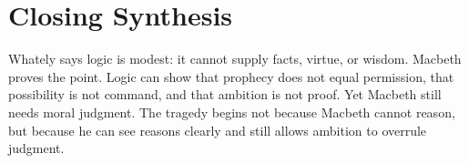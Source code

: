 \documentclass[12pt]{article}
\begin{document}
\section*{Closing Synthesis}
Whately says logic is modest: it cannot supply facts, virtue, or wisdom. Macbeth proves the point. Logic can show that prophecy does not equal permission, that possibility is not command, and that ambition is not proof. Yet Macbeth still needs moral judgment. The tragedy begins not because Macbeth cannot reason, but because he can see reasons clearly and still allows ambition to overrule judgment.
\end{document}
